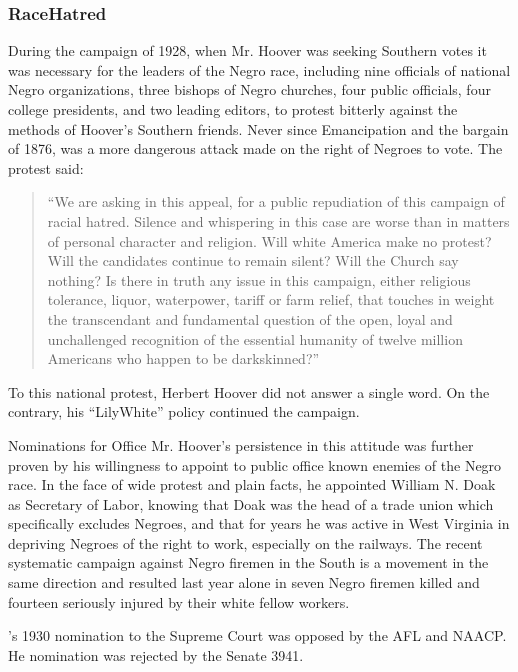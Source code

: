 \documentclass[letterpaper,10pt,english]{jupyterBook}
\begin{document}
\subsubsection{Race\sphinxhyphen{}Hatred}
\label{\detokenize{Volumes/39/11/herbert_hoover:race-hatred}}
\sphinxAtStartPar
During the campaign of 1928, when Mr. Hoover was seeking Southern votes it was necessary for the leaders of the Negro race, including nine officials of national Negro organizations, three bishops of Negro churches, four public officials, four college presidents, and two leading editors, to protest bitterly against the methods of Hoover’s Southern friends. Never since Emancipation and the bargain of 1876, was a more dangerous attack made on the right of Negroes to vote. The protest said:
\begin{quote}

\sphinxAtStartPar
“We are asking in this appeal, for a public repudiation of this campaign of racial hatred. Silence and whispering in this case are worse than in matters of personal character and religion. Will white America make no protest? Will the candidates continue to remain silent? Will the Church say nothing? Is there in truth any issue in this campaign, either religious tolerance, liquor, water\sphinxhyphen{}power, tariff or farm relief, that touches in weight the transcendant and fundamental question of the open, loyal and unchallenged recognition of the essential humanity of twelve million Americans who happen to be dark\sphinxhyphen{}skinned?”
\end{quote}

\sphinxAtStartPar
To this national protest, Herbert Hoover did not answer a single word. On the contrary, his “Lily\sphinxhyphen{}White” policy continued the campaign.

\sphinxAtStartPar
Nominations for Office Mr. Hoover’s persistence in this attitude was further proven by his willingness to appoint to public office known enemies of the Negro race. In the face of wide protest and plain facts, he appointed William N. Doak as Secretary of Labor, knowing that Doak was the head of a trade union which specifically excludes Negroes, and that for years he was active in West Virginia in depriving Negroes of the right to work, especially on the railways. The recent systematic campaign against Negro firemen in the South is a movement in the same direction and resulted last year alone in seven Negro firemen killed and fourteen seriously injured by their white fellow workers.

\begin{sphinxShadowBox}
\sphinxstylesidebartitle{}

\sphinxAtStartPar
{}’s 1930 nomination to the Supreme Court was opposed by the AFL and NAACP. He nomination was rejected by the Senate 39\sphinxhyphen{}41.
\end{sphinxShadowBox}
\end{document}
